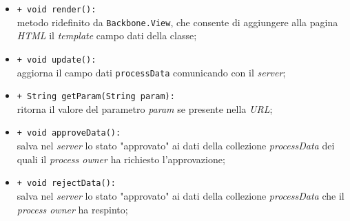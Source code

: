 \begin{flushleft}
\begin{itemize}
\begin{sloppypar}
\begin{itemize}
\item \texttt{+ void render():}\\ metodo ridefinito da \texttt{Backbone.View}, che consente di aggiungere alla pagina \textit{HTML} il \textit{template} campo dati della classe;
\item \texttt{+ void update():}\\ aggiorna il campo dati \texttt{processData} comunicando con il \textit{server};
\item \texttt{+ String getParam(String param):}\\ ritorna il valore del parametro \textit{param} se presente nella \textit{URL};
\item \texttt{+ void approveData():}\\ salva nel \textit{server} lo stato "approvato" ai dati della collezione \textit{processData} dei quali il \textit{process owner} ha richiesto l'approvazione;
\item \texttt{+ void rejectData():}\\ salva nel \textit{server} lo stato "approvato" ai dati della collezione \textit{processData} che il \textit{process owner} ha respinto;
\end{itemize}
\end{sloppypar}
\end{itemize}
\end{flushleft}